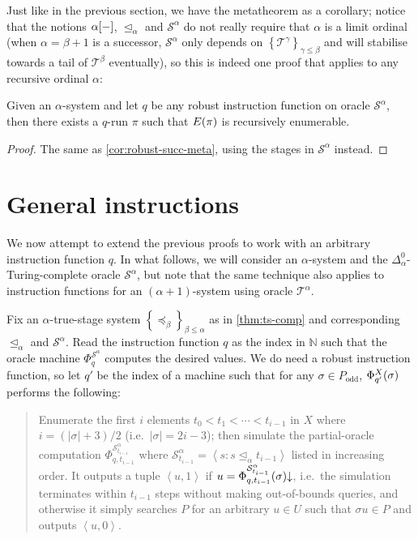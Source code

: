 \documentclass[11pt]{article}
\theoremstyle{plain}
\theoremstyle{definition}
\newcommand{\tuple}[1]{\left\langle #1 \right\rangle}
\begin{document}
Just like in the previous section, we have the metatheorem as a corollary; notice that the notions $\alpha\mleft[{-}\mright]$, $\unlhd_\alpha$ and $\mathcal{S}^\alpha$ do not really require that $\alpha$ is a limit ordinal (when $\alpha = \beta + 1$ is a successor, $\mathcal{S}^\alpha$ only depends on $\left\{\mathcal{T}^\gamma\right\}_{\gamma \leq \beta}$ and will stabilise towards a tail of $\mathcal{T}^\beta$ eventually), so this is indeed one proof that applies to any recursive ordinal $\alpha$:

\begin{corollary}
  \label{cor:robust-limit-meta}
  Given an $\alpha$-system and let $q$ be any robust instruction function on oracle $\mathcal{S}^\alpha$, then there exists a $q$-run $\pi$ such that $E\mleft(\pi\mright)$ is recursively enumerable.
\end{corollary}

\begin{proof}
  The same as \autoref{cor:robust-succ-meta}, using the stages in $\mathcal{S}^\alpha$ instead.
\end{proof}

\section{General instructions}
\label{sec:gen-instr}

We now attempt to extend the previous proofs to work with an arbitrary instruction function $q$. In what follows, we will consider an $\alpha$-system and the $\Delta^0_\alpha$-Turing-complete oracle $\mathcal{S}^\alpha$, but note that the same technique also applies to instruction functions for an $\left(\alpha + 1\right)$-system using oracle $\mathcal{T}^\alpha$.

Fix an $\alpha$-true-stage system $\left\{\preceq_\beta\right\}_{\beta \leq \alpha}$ as in \autoref{thm:ts-comp} and corresponding $\unlhd_\alpha$ and $\mathcal{S}^\alpha$. Read the instruction function $q$ as the index in $\mathbb{N}$ such that the oracle machine $\Phi_q^{\mathcal{S}^\alpha}$ computes the desired values. We do need a robust instruction function, so let $q'$ be the index of a machine such that for any $\sigma \in P_\text{odd}$, $\Phi_{q'}^X\mleft(\sigma\mright)$ performs the following:

\begin{quote}
  Enumerate the first $i$ elements $t_0 < t_1 < \cdots < t_{i - 1}$ in $X$ where $i = \left(\left|\sigma\right| + 3\right) / 2$ (i.e.\ $\left|\sigma\right| = 2i - 3$); then simulate the partial-oracle computation $\Phi_{q, t_{i - 1}}^{\mathcal{S}^\alpha_{t_{i - 1}}}$ where $\mathcal{S}^\alpha_{t_{i - 1}} = \tuple{s : s \unlhd_\alpha t_{i - 1}}$ listed in increasing order. It outputs a tuple $\tuple{u, 1}$ if $u = \Phi_{q, t_{i - 1}}^{\mathcal{S}^\alpha_{t_{i - 1}}}\mleft(\sigma\mright) {\downarrow}$, i.e.\ the simulation terminates within $t_{i - 1}$ steps without making out-of-bounds queries, and otherwise it simply searches $P$ for an arbitrary $u \in U$ such that $\sigma u \in P$ and outputs $\tuple{u, 0}$.
\end{quote}
\end{document}
